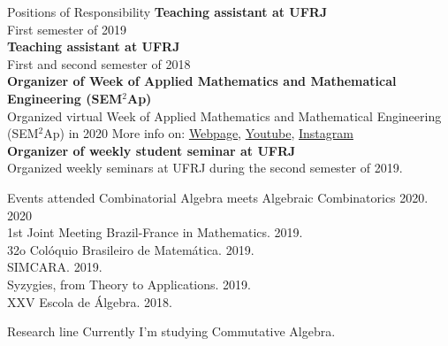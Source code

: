 \documentclass{resume} %
\begin{document}

\begin{rSection}{Positions of Responsibility}
{\bf Teaching assistant at UFRJ} 
\\
First semester of 2019
\\
{\bf Teaching assistant at UFRJ} 
\\
First and second semester of 2018
\\
{\bf Organizer of Week of Applied Mathematics and Mathematical Engineering (SEM$^2$Ap)}
\\
Organized virtual Week of Applied Mathematics and Mathematical Engineering (SEM$^2$Ap) in 2020
{\scriptsize More info on:  \href{http://semap.rio.br}{Webpage},   \href{https://www.youtube.com/channel/UC14NMQ5cOsSuLrAQGGa2T4Q}{Youtube}, 
\href{https://www.instagram.com/semap.rio/}{Instagram}}
\\
{\bf Organizer of weekly student seminar at UFRJ}
\\
Organized weekly seminars at UFRJ during the second semester of 2019.
\end{rSection}


\begin{rSection}{Events attended}
Combinatorial Algebra meets Algebraic Combinatorics 2020. 2020
\\ 1st Joint Meeting Brazil-France in Mathematics. 2019.
\\ 32o Colóquio Brasileiro de Matemática. 2019.
\\ SIMCARA. 2019.
\\ Syzygies, from Theory to Applications. 2019.
\\ XXV Escola de Álgebra. 2018.
\\
\end{rSection}

\begin{rSection}{Research line}
Currently I'm studying Commutative Algebra.

\end{rSection}
\end{document}
